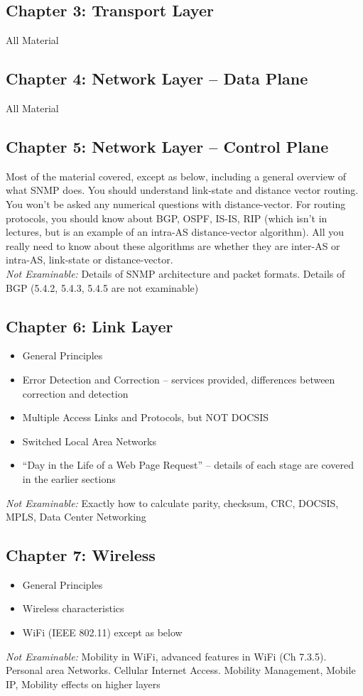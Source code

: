 \documentclass[12pt, a4paper]{article}
\begin{document}
\begin{multicols*}{2}
	\subsection{Chapter 3: Transport Layer}
	All Material
	\subsection{Chapter 4: Network Layer -- Data Plane}
	All Material
	\subsection{Chapter 5: Network Layer -- Control Plane}
	Most of the material covered, except as below, including a general overview of what SNMP does. You should understand link-state and distance vector routing. You won't be asked any numerical questions with distance-vector. For routing protocols, you should know about BGP, OSPF, IS-IS, RIP (which isn't in lectures, but is an example of an intra-AS distance-vector algorithm). All you really need to know about these algorithms are whether they are inter-AS or intra-AS, link-state or distance-vector.\\
	\textit{Not Examinable:} Details of SNMP architecture and packet formats. Details of BGP (5.4.2, 5.4.3, 5.4.5 are not examinable)
	\subsection{Chapter 6: Link Layer}
	\begin{itemize}
		\item General Principles
		\item Error Detection and Correction -- services provided, differences between correction and detection
		\item Multiple Access Links and Protocols, but NOT DOCSIS
		\item Switched Local Area Networks
		\item ``Day in the Life of a Web Page Request'' -- details of each stage are covered in the earlier sections
	\end{itemize}
	\textit{Not Examinable:} Exactly how to calculate parity, checksum, CRC, DOCSIS, MPLS, Data Center Networking
	\subsection{Chapter 7: Wireless}
	\begin{itemize}
		\item General Principles
		\item Wireless characteristics
		\item WiFi (IEEE 802.11) except as below
	\end{itemize}
	\textit{Not Examinable:} Mobility in WiFi, advanced features in WiFi (Ch 7.3.5). Personal area Networks. Cellular Internet Access. Mobility Management, Mobile IP, Mobility effects on higher layers

\end{multicols*}
\end{document}

